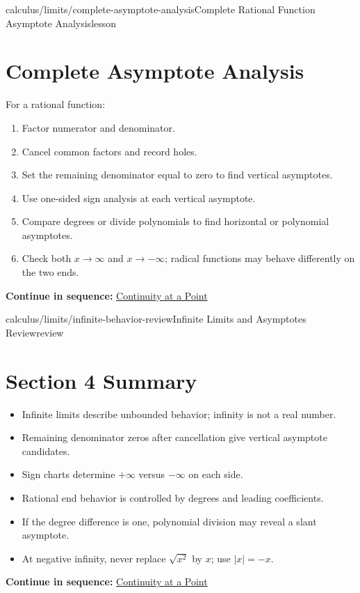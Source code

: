 \documentclass[11pt,openany]{book}
\theoremstyle{bgplain}
\newcommand{\webnext}[2]{%
  \par\addvspace{1.2em}\noindent{\color{BGLine}\rule{\textwidth}{0.35pt}}\par\smallskip
  {\small\color{BGGray}\textbf{Continue in sequence:} \hyperlink{web:#1}{#2}}\par
}
\begin{document}
\begin{webpage}{calculus/limits/complete-asymptote-analysis}{Complete Rational Function Asymptote Analysis}{lesson}
\section{Complete Asymptote Analysis}

\begin{bgmethod}[title={Rational-Function Analysis Checklist}]
For a rational function:
\begin{enumerate}
  \item Factor numerator and denominator.
  \item Cancel common factors and record holes.
  \item Set the remaining denominator equal to zero to find vertical asymptotes.
  \item Use one-sided sign analysis at each vertical asymptote.
  \item Compare degrees or divide polynomials to find horizontal or polynomial asymptotes.
  \item Check both \(x\to\infty\) and \(x\to-\infty\); radical functions may behave differently on the two ends.
\end{enumerate}
\end{bgmethod}
\webnext{calculus/continuity/continuity-at-a-point}{Continuity at a Point}
\end{webpage}

\begin{webpage}{calculus/limits/infinite-behavior-review}{Infinite Limits and Asymptotes Review}{review}
\section*{Section 4 Summary}

\begin{bgsummary}
\begin{itemize}
  \item Infinite limits describe unbounded behavior; infinity is not a real number.
  \item Remaining denominator zeros after cancellation give vertical asymptote candidates.
  \item Sign charts determine \(+\infty\) versus \(-\infty\) on each side.
  \item Rational end behavior is controlled by degrees and leading coefficients.
  \item If the degree difference is one, polynomial division may reveal a slant asymptote.
  \item At negative infinity, never replace \(\sqrt{x^2}\) by \(x\); use \(|x|=-x\).
\end{itemize}
\end{bgsummary}
\webnext{calculus/continuity/continuity-at-a-point}{Continuity at a Point}
\end{webpage}
\end{document}
